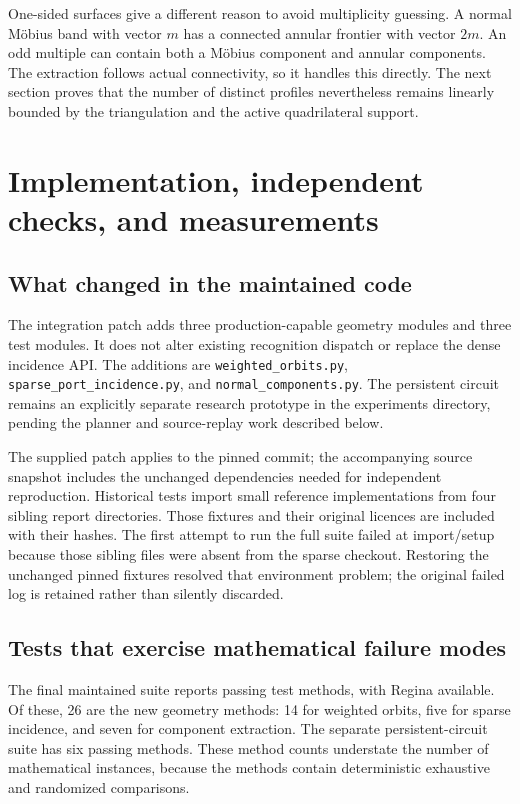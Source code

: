 \documentclass[11pt,a4paper]{article}
\theoremstyle{definition}
\theoremstyle{remark}
\newcommand{\code}[1]{\texttt{#1}}
\begin{document}
One-sided surfaces give a different reason to avoid multiplicity guessing.
A normal Möbius band with vector $m$ has a connected annular frontier with
vector $2m$. An odd multiple can contain both a Möbius component and
annular components. The extraction follows actual connectivity, so it
handles this directly. The next section proves that the number of distinct
profiles nevertheless remains linearly bounded by the triangulation and
the active quadrilateral support.




\section{Implementation, independent checks, and measurements}
\label{sec:experiments}

\subsection{What changed in the maintained code}

The integration patch adds three production-capable geometry modules and
three test modules. It does not alter existing recognition dispatch or
replace the dense incidence API. The additions are
\code{weighted\_orbits.py}, \code{sparse\_port\_incidence.py}, and
\code{normal\_components.py}. The persistent circuit remains an explicitly
separate research prototype in the experiments directory, pending the
planner and source-replay work described below.

The supplied patch applies to the pinned commit; the accompanying source
snapshot includes the unchanged dependencies needed for independent
reproduction. Historical tests import small reference implementations from
four sibling report directories. Those fixtures and their original licences
are included with their hashes. The first attempt to run the full suite
failed at import/setup because those sibling files were absent from the
sparse checkout. Restoring the unchanged pinned fixtures resolved that
environment problem; the original failed log is retained rather than
silently discarded.

\subsection{Tests that exercise mathematical failure modes}

The final maintained suite reports \FullTests{} passing test methods, with
Regina available. Of these, 26 are the new geometry methods: 14 for weighted
orbits, five for sparse incidence, and seven for component extraction.
The separate persistent-circuit suite has six passing methods. These
method counts understate the number of mathematical instances, because
the methods contain deterministic exhaustive and randomized comparisons.
\end{document}
